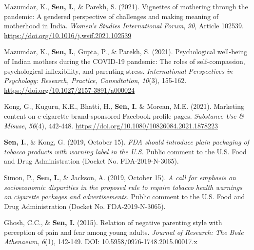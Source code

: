 \documentclass[a4paper,11pt]{article}
\begin{document}
{\begin{enumerate}[leftmargin=*, labelsep=0.5em, align=left, widest={[\textbf{S.1}]}, itemindent=0em, label={\textbf{[\arabic*]}}]
    \item Mazumdar, K., \textbf{Sen, I.}, \& Parekh, S. (2021). Vignettes of mothering through the pandemic: A gendered perspective of challenges and making meaning of motherhood in
          India. \textit{Women's Studies International Forum}, \textit{90}, Article 102539. \href{https://doi.org/10.1016/j.wsif.2021.102539}{https://doi.org/10.1016/j.wsif.2021.102539}

    \item Mazumdar, K., \textbf{Sen, I.}, Gupta, P., \& Parekh, S. (2021). Psychological well-being of Indian mothers during the COVID-19 pandemic: The roles of self-compassion,
          psychological inflexibility, and parenting stress. \textit{International Perspectives in Psychology: Research, Practice, Consultation}, \textit{10}(3), 155-162.
          \href{https://doi.org/10.1027/2157-3891/a000024}{https://doi.org/10.1027/2157-3891/a000024}

    \item Kong, G., Kuguru, K.E., Bhatti, H., \textbf{Sen, I.} \& Morean, M.E. (2021). Marketing content on e-cigarette brand-sponsored Facebook profile pages. \textit{Substance Use \& Misuse},
          \textit{56}(4), 442-448. \href{https://doi.org/10.1080/10826084.2021.1878223}{https://doi.org/10.1080/10826084.2021.1878223}

    \item \textbf{Sen, I.}, \& Kong, G. (2019, October 15). \textit{FDA should introduce plain packaging of tobacco products with warning label in the U.S.} Public comment to the U.S. Food and
          Drug Administration (Docket No. FDA-2019-N-3065).

    \item Simon, P., \textbf{Sen, I.}, \& Jackson, A. (2019, October 15). \textit{A call for emphasis on socioeconomic disparities in the proposed rule to require tobacco health warnings on
            cigarette packages and advertisements.} Public comment to the U.S. Food and Drug Administration (Docket No. FDA-2019-N-3065).

    \item Ghosh, C.C., \& \textbf{Sen, I.} (2015). Relation of negative parenting style with perception of pain and fear among young adults. \textit{Journal of Research: The Bede Athenaeum},
          \textit{6}(1), 142-149. DOI: 10.5958/0976-1748.2015.00017.x

  \end{enumerate}
}
\end{document}
